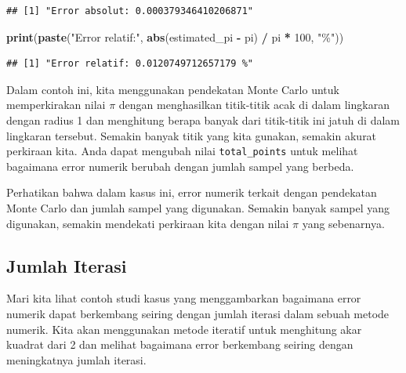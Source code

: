 \documentclass[
]{book}
\newenvironment{Shaded}{\begin{snugshade}}{\end{snugshade}}
\newcommand{\DecValTok}[1]{\textcolor[rgb]{0.00,0.00,0.81}{#1}}
\newcommand{\FunctionTok}[1]{\textcolor[rgb]{0.13,0.29,0.53}{\textbf{#1}}}
\newcommand{\NormalTok}[1]{#1}
\newcommand{\SpecialCharTok}[1]{\textcolor[rgb]{0.81,0.36,0.00}{\textbf{#1}}}
\newcommand{\StringTok}[1]{\textcolor[rgb]{0.31,0.60,0.02}{#1}}
\theoremstyle{definition}
\theoremstyle{definition}
\theoremstyle{definition}
\theoremstyle{definition}
\theoremstyle{remark}
\begin{document}
\begin{verbatim}
## [1] "Error absolut: 0.000379346410206871"
\end{verbatim}

\begin{Shaded}
\begin{Highlighting}[]
\FunctionTok{print}\NormalTok{(}\FunctionTok{paste}\NormalTok{(}\StringTok{"Error relatif:"}\NormalTok{, }\FunctionTok{abs}\NormalTok{(estimated\_pi }\SpecialCharTok{{-}}\NormalTok{ pi) }\SpecialCharTok{/}\NormalTok{ pi }\SpecialCharTok{*} \DecValTok{100}\NormalTok{, }\StringTok{"\%"}\NormalTok{))}
\end{Highlighting}
\end{Shaded}

\begin{verbatim}
## [1] "Error relatif: 0.0120749712657179 %"
\end{verbatim}

Dalam contoh ini, kita menggunakan pendekatan Monte Carlo untuk memperkirakan nilai \(π\) dengan menghasilkan titik-titik acak di dalam lingkaran dengan radius 1 dan menghitung berapa banyak dari titik-titik ini jatuh di dalam lingkaran tersebut. Semakin banyak titik yang kita gunakan, semakin akurat perkiraan kita. Anda dapat mengubah nilai \texttt{total\_points} untuk melihat bagaimana error numerik berubah dengan jumlah sampel yang berbeda.

Perhatikan bahwa dalam kasus ini, error numerik terkait dengan pendekatan Monte Carlo dan jumlah sampel yang digunakan. Semakin banyak sampel yang digunakan, semakin mendekati perkiraan kita dengan nilai \(π\) yang sebenarnya.

\hypertarget{jumlah-iterasi}{%
\subsection{Jumlah Iterasi}\label{jumlah-iterasi}}

Mari kita lihat contoh studi kasus yang menggambarkan bagaimana error numerik dapat berkembang seiring dengan jumlah iterasi dalam sebuah metode numerik. Kita akan menggunakan metode iteratif untuk menghitung akar kuadrat dari 2 dan melihat bagaimana error berkembang seiring dengan meningkatnya jumlah iterasi.
\end{document}
